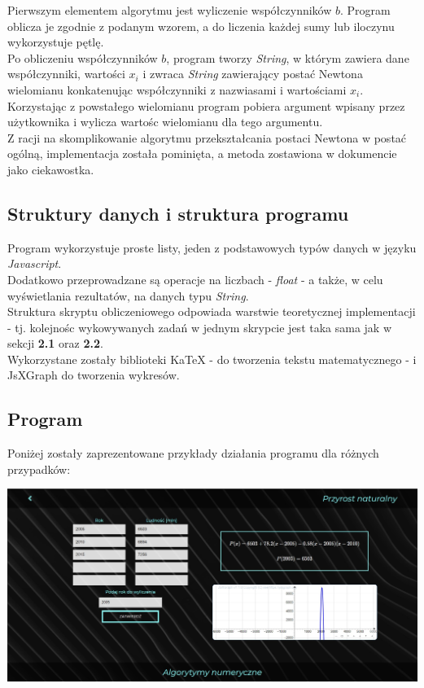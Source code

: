 \documentclass[a4paper,12pt]{article}
\newcommand{\id}{\noindent}
\begin{document}
\id
Pierwszym elementem algorytmu jest wyliczenie współczynników $b$. Program oblicza je zgodnie z podanym wzorem, a do liczenia każdej sumy lub iloczynu wykorzystuje pętlę. \\


\id
Po obliczeniu współczynników $b$, program tworzy \textit{String}, w którym zawiera dane współczynniki, wartości $x_i$ i zwraca \textit{String} zawierający postać Newtona wielomianu konkatenując współczynniki z nazwiasami i wartościami $x_i$. \\

\id
Korzystając z powstałego wielomianu program pobiera argument wpisany przez użytkownika i wylicza wartośc wielomianu dla tego argumentu. \\

\id
Z racji na skomplikowanie algorytmu przekształcania postaci Newtona w postać ogólną, implementacja została pominięta, a metoda zostawiona w dokumencie jako ciekawostka.

\subsection{Struktury danych i struktura programu}

\id
Program wykorzystuje proste listy, jeden z podstawowych typów danych w języku \textit{Javascript}. \\

\id
Dodatkowo przeprowadzane są operacje na liczbach - \textit{float} - a także, w celu wyświetlania rezultatów, na danych typu \textit{String}. \\

\id
Struktura skryptu obliczeniowego odpowiada warstwie teoretycznej implementacji - tj. kolejnośc wykowywanych zadań w jednym skrypcie jest taka sama jak w sekcji \textbf{2.1} oraz \textbf{2.2}. \\

\id
Wykorzystane zostały biblioteki KaTeX - do tworzenia tekstu matematycznego - i JsXGraph do tworzenia wykresów.

\subsection{Program}

\id
Poniżej zostały zaprezentowane przykłady działania programu dla różnych przypadków: \\

\begin{center}
\includegraphics[width=1\textwidth]{proj1sc1.jpg} \\
\end{center} 
\end{document}
